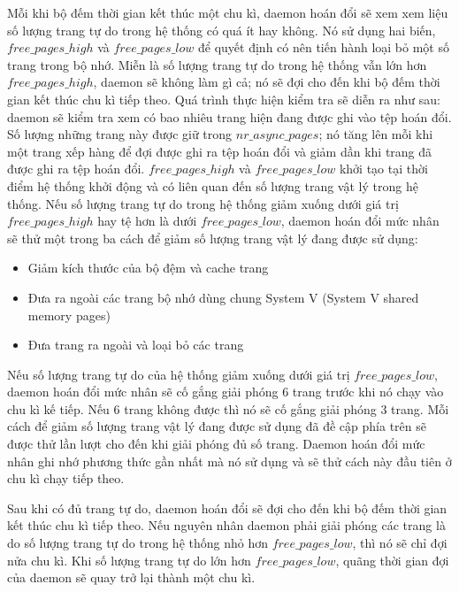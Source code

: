 \documentclass{article}
\begin{document}
Mỗi khi bộ đếm thời gian kết thúc một chu kì, daemon hoán đổi sẽ xem xem liệu số lượng trang tự do trong hệ thống có quá ít hay không. Nó sử dụng hai biến, $free\_pages\_high$ và $free\_pages\_low$ để quyết định có nên tiến hành loại bỏ một số trang trong bộ nhớ. Miễn là số lượng trang tự do trong hệ thống vẫn lớn hơn $free\_pages\_high$, daemon sẽ không làm gì cả; nó sẽ đợi cho đến khi bộ đếm thời gian kết thúc chu kì tiếp theo. Quá trình thực hiện kiểm tra sẽ diễn ra như sau: daemon sẽ kiểm tra xem có bao nhiêu trang hiện đang được ghi vào tệp hoán đổi. Số lượng những trang này được giữ trong $nr\_async\_pages$; nó tăng lên mỗi khi một trang xếp hàng để đợi được ghi ra tệp hoán đổi và giảm dần khi trang đã được ghi ra tệp hoán đổi. $free\_pages\_high$ và $free\_pages\_low$ khởi tạo tại thời điểm hệ thống khởi động và có liên quan đến số lượng trang vật lý trong hệ thống. Nếu số lượng trang tự do trong hệ thống giảm xuống dưới giá trị $free\_pages\_high$ hay tệ hơn là dưới $free\_pages\_low$, daemon hoán đổi mức nhân sẽ thử một trong ba cách để giảm số lượng trang vật lý đang được sử dụng:

\begin{itemize}
  \item Giảm kích thước của bộ đệm và cache trang
  \item Đưa ra ngoài các trang bộ nhớ dùng chung System V (System V shared memory pages)
  \item Đưa trang ra ngoài và loại bỏ các trang
\end{itemize}

Nếu số lượng trang tự do của hệ thống giảm xuống dưới giá trị $free\_pages\_low$, daemon hoán đổi mức nhân sẽ cố gắng giải phóng 6 trang trước khi nó chạy vào chu kì kế tiếp. Nếu 6 trang không được thì nó sẽ cố gắng giải phóng 3 trang. Mỗi cách để giảm số lượng trang vật lý đang được sử dụng đã đề cập phía trên sẽ được thử lần lượt cho đến khi giải phóng đủ số trang. Daemon hoán đổi mức nhân ghi nhớ phương thức gần nhất mà nó sử dụng và sẽ thử cách này đầu tiên ở chu kì chạy tiếp theo.\vspace{1em}

Sau khi có đủ trang tự do, daemon hoán đổi sẽ đợi cho đến khi bộ đếm thời gian kết thúc chu kì tiếp theo. Nếu nguyên nhân daemon phải giải phóng các trang là do số lượng trang tự do trong hệ thống nhỏ hơn $free\_pages\_low$, thì nó sẽ chỉ đợi nửa chu kì. Khi số lượng trang tự do lớn hơn $free\_pages\_low$, quãng thời gian đợi của daemon sẽ quay trở lại thành một chu kì.\vspace{1em}
\end{document}
